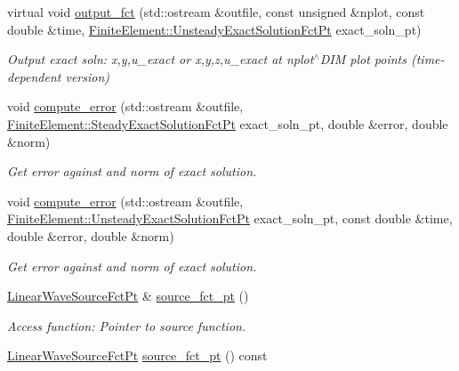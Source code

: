 \begin{DoxyCompactItemize}
virtual void \hyperlink{classoomph_1_1LinearWaveEquations_aa0089c4e106d9bd525639d3215ed6825}{output\+\_\+fct} (std\+::ostream \&outfile, const unsigned \&nplot, const double \&time, \hyperlink{classoomph_1_1FiniteElement_ad4ecf2b61b158a4b4d351a60d23c633e}{Finite\+Element\+::\+Unsteady\+Exact\+Solution\+Fct\+Pt} exact\+\_\+soln\+\_\+pt)
\begin{DoxyCompactList}\small\item\em Output exact soln\+: x,y,u\+\_\+exact or x,y,z,u\+\_\+exact at nplot$^\wedge$\+D\+IM plot points (time-\/dependent version) \end{DoxyCompactList}\item 
void \hyperlink{classoomph_1_1LinearWaveEquations_acf05d02ed25f46d2b0b8310fb8bc448b}{compute\+\_\+error} (std\+::ostream \&outfile, \hyperlink{classoomph_1_1FiniteElement_a690fd33af26cc3e84f39bba6d5a85202}{Finite\+Element\+::\+Steady\+Exact\+Solution\+Fct\+Pt} exact\+\_\+soln\+\_\+pt, double \&error, double \&norm)
\begin{DoxyCompactList}\small\item\em Get error against and norm of exact solution. \end{DoxyCompactList}\item 
void \hyperlink{classoomph_1_1LinearWaveEquations_ae2dedf5d1dc024da927b05f532dde540}{compute\+\_\+error} (std\+::ostream \&outfile, \hyperlink{classoomph_1_1FiniteElement_ad4ecf2b61b158a4b4d351a60d23c633e}{Finite\+Element\+::\+Unsteady\+Exact\+Solution\+Fct\+Pt} exact\+\_\+soln\+\_\+pt, const double \&time, double \&error, double \&norm)
\begin{DoxyCompactList}\small\item\em Get error against and norm of exact solution. \end{DoxyCompactList}\item 
\hyperlink{classoomph_1_1LinearWaveEquations_a9648dd63c18bab6854d362d16f01e33d}{Linear\+Wave\+Source\+Fct\+Pt} \& \hyperlink{classoomph_1_1LinearWaveEquations_aeca44d03c936545d7641f41ac977e3f3}{source\+\_\+fct\+\_\+pt} ()
\begin{DoxyCompactList}\small\item\em Access function\+: Pointer to source function. \end{DoxyCompactList}\item 
\hyperlink{classoomph_1_1LinearWaveEquations_a9648dd63c18bab6854d362d16f01e33d}{Linear\+Wave\+Source\+Fct\+Pt} \hyperlink{classoomph_1_1LinearWaveEquations_a61de270efb6fb0149da99d221580d13f}{source\+\_\+fct\+\_\+pt} () const

\end{DoxyCompactItemize}
